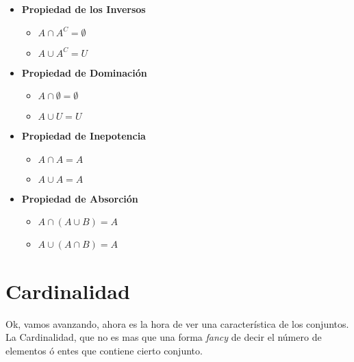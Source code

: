 \documentclass[12pt]{report}                                    %
\begin{document}
\begin{itemize}
            \item \textbf{Propiedad de los Inversos}
                \begin{itemize}
                    \item $A \cap A^C = \emptyset$
                    \item $A \cup A^C = U$
                \end{itemize}

            \item \textbf{Propiedad de Dominación}
                \begin{itemize}
                    \item $A \cap \emptyset = \emptyset$
                    \item $A \cup U = U$
                \end{itemize}

            \item \textbf{Propiedad de Inepotencia}
                \begin{itemize}
                    \item $A \cap A = A$
                    \item $A \cup A = A$
                \end{itemize}

            \item \textbf{Propiedad de Absorción}
                \begin{itemize}
                    \item $A \cap (A \cup B) = A$
                    \item $A \cup (A \cap B) = A$
                \end{itemize}

        \end{itemize}



    \clearpage
    \section{Cardinalidad}
            
        Ok, vamos avanzando, ahora es la hora de ver una característica de los conjuntos.
        La Cardinalidad, que no es mas que una forma \emph{fancy} de decir el número de 
        elementos ó entes que contiene cierto conjunto.
\end{document}
